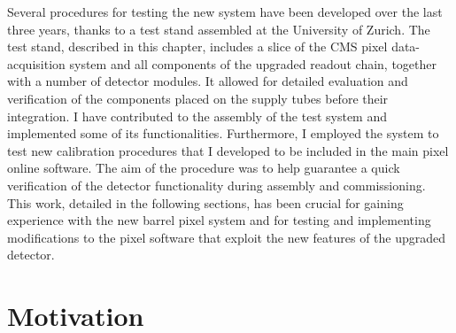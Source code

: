 Several procedures for testing the new system have been developed over the last three years, thanks to a test stand assembled at the University of Zurich. The test stand, described in this chapter, includes a slice of the CMS pixel data-acquisition system and all components of the upgraded readout chain, together with a number of detector modules. It allowed for detailed evaluation and verification of the components placed on the supply tubes before their integration.
I have contributed to the assembly of the test system and implemented some of its functionalities. Furthermore, I employed the system to test new calibration procedures that I developed to be included in the main pixel online software. The aim of the procedure was to help guarantee a quick verification of the detector functionality during assembly and commissioning. This work, detailed in the following sections, has been crucial for gaining experience with the new barrel pixel system and for testing and implementing modifications to the pixel software
that exploit the new features of the upgraded detector.

\section{Motivation}

